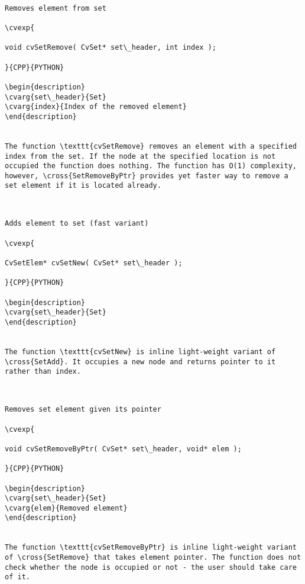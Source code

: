 \begin{verbatim}

Removes element from set

\cvexp{

void cvSetRemove( CvSet* set\_header, int index );

}{CPP}{PYTHON}

\begin{description}
\cvarg{set\_header}{Set}
\cvarg{index}{Index of the removed element}
\end{description}


The function \texttt{cvSetRemove} removes an element with a specified index from the set. If the node at the specified location is not occupied the function does nothing. The function has O(1) complexity, however, \cross{SetRemoveByPtr} provides yet faster way to remove a set element if it is located already.


\end{verbatim}
\begin{verbatim}

Adds element to set (fast variant)

\cvexp{

CvSetElem* cvSetNew( CvSet* set\_header );

}{CPP}{PYTHON}

\begin{description}
\cvarg{set\_header}{Set}
\end{description}


The function \texttt{cvSetNew} is inline light-weight variant of \cross{SetAdd}. It occupies a new node and returns pointer to it rather than index.


\end{verbatim}
\begin{verbatim}

Removes set element given its pointer

\cvexp{

void cvSetRemoveByPtr( CvSet* set\_header, void* elem );

}{CPP}{PYTHON}

\begin{description}
\cvarg{set\_header}{Set}
\cvarg{elem}{Removed element}
\end{description}


The function \texttt{cvSetRemoveByPtr} is inline light-weight variant of \cross{SetRemove} that takes element pointer. The function does not check whether the node is occupied or not - the user should take care of it.


\end{verbatim}
